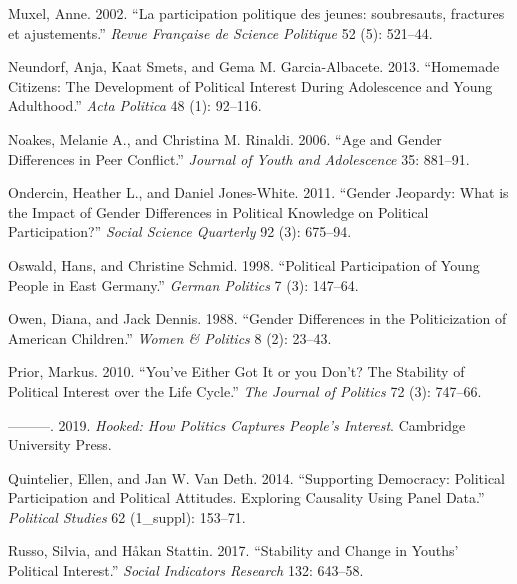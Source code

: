 \documentclass[
  letterpaper,
  DIV=11,
  numbers=noendperiod]{scrreprt}
\newlength{\cslhangindent}
\newlength{\cslentryspacingunit} %
\newenvironment{CSLReferences}[2] %
 {%
  \setlength{\parindent}{0pt}
  \ifodd #1
  \let\oldpar\par
  \def\par{\hangindent=\cslhangindent\oldpar}
  \fi
  \setlength{\parskip}{#2\cslentryspacingunit}
 }%
 {}
\begin{document}
\begin{CSLReferences}{1}{0}
\leavevmode{}%
Muxel, Anne. 2002. {``{La participation politique des jeunes:
soubresauts, fractures et ajustements}.''} \emph{Revue Fran{ç}aise de
Science Politique} 52 (5): 521--44.

\leavevmode{}%
Neundorf, Anja, Kaat Smets, and Gema M. Garcia-Albacete. 2013.
{``{Homemade Citizens: The Development of Political Interest During
Adolescence and Young Adulthood}.''} \emph{Acta Politica} 48 (1):
92--116.

\leavevmode{}%
Noakes, Melanie A., and Christina M. Rinaldi. 2006. {``{Age and Gender
Differences in Peer Conflict}.''} \emph{Journal of Youth and
Adolescence} 35: 881--91.

\leavevmode{}%
Ondercin, Heather L., and Daniel Jones-White. 2011. {``{Gender Jeopardy:
What is the Impact of Gender Differences in Political Knowledge on
Political Participation?}''} \emph{Social Science Quarterly} 92 (3):
675--94.

\leavevmode{}%
Oswald, Hans, and Christine Schmid. 1998. {``{Political Participation of
Young People in East Germany}.''} \emph{German Politics} 7 (3): 147--64.

\leavevmode{}%
Owen, Diana, and Jack Dennis. 1988. {``{Gender Differences in the
Politicization of American Children}.''} \emph{Women \& Politics} 8 (2):
23--43.

\leavevmode{}%
Prior, Markus. 2010. {``{You've Either Got It or you Don't? The
Stability of Political Interest over the Life Cycle}.''} \emph{The
Journal of Politics} 72 (3): 747--66.

\leavevmode{}%
---------. 2019. \emph{{Hooked: How Politics Captures People's
Interest}}. Cambridge University Press.

\leavevmode{}%
Quintelier, Ellen, and Jan W. Van Deth. 2014. {``{Supporting Democracy:
Political Participation and Political Attitudes. Exploring Causality
Using Panel Data}.''} \emph{Political Studies} 62 (1\_suppl): 153--71.

\leavevmode{}%
Russo, Silvia, and Håkan Stattin. 2017. {``Stability and Change in
Youths' Political Interest.''} \emph{Social Indicators Research} 132:
643--58.


\end{CSLReferences}
\end{document}

